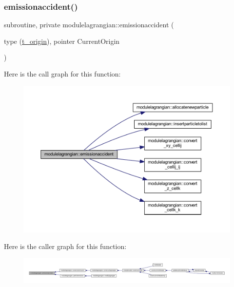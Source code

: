 \subsubsection{\texorpdfstring{emissionaccident()}{emissionaccident()}}
{\footnotesize\ttfamily subroutine, private modulelagrangian\+::emissionaccident (\begin{DoxyParamCaption}\item[{type (\mbox{\hyperlink{structmodulelagrangian_1_1t__origin}{t\+\_\+origin}}), pointer}]{Current\+Origin }\end{DoxyParamCaption})\hspace{0.3cm}{\ttfamily [private]}}

Here is the call graph for this function\+:\nopagebreak
\begin{figure}[H]
\begin{center}
\leavevmode
\includegraphics[width=350pt]{namespacemodulelagrangian_a979d39b0267ea25c8a2db002477e9ffd_cgraph}
\end{center}
\end{figure}
Here is the caller graph for this function\+:\nopagebreak
\begin{figure}[H]
\begin{center}
\leavevmode
\includegraphics[width=350pt]{namespacemodulelagrangian_a979d39b0267ea25c8a2db002477e9ffd_icgraph}
\end{center}
\end{figure}
\mbox{\label{namespacemodulelagrangian_a909284268900b0a5945c1fde9e70be9c}} 
